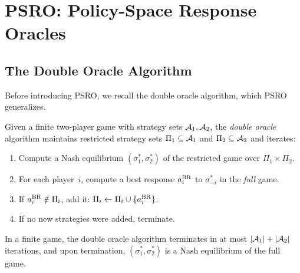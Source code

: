 \documentclass[11pt,a4paper]{article}
\begin{document}
\section{PSRO: Policy-Space Response Oracles}
\label{sec:psro}

\subsection{The Double Oracle Algorithm}

Before introducing PSRO, we recall the double oracle algorithm, which
PSRO generalizes.

\begin{definition}
\label{def:double-oracle}
Given a finite two-player game with strategy sets $\mathcal{A}_1, \mathcal{A}_2$,
the \emph{double oracle} algorithm maintains restricted strategy sets
$\Pi_1 \subseteq \mathcal{A}_1$ and $\Pi_2 \subseteq \mathcal{A}_2$ and
iterates:
\begin{enumerate}
  \item Compute a Nash equilibrium $(\sigma_1^*, \sigma_2^*)$ of the
    restricted game over $\Pi_1 \times \Pi_2$.
  \item For each player~$i$, compute a best response $a_i^{\mathrm{BR}}$ to
    $\sigma_{-i}^*$ in the \emph{full} game.
  \item If $a_i^{\mathrm{BR}} \notin \Pi_i$, add it: $\Pi_i \leftarrow \Pi_i
    \cup \{a_i^{\mathrm{BR}}\}$.
  \item If no new strategies were added, terminate.
\end{enumerate}
\end{definition}

\begin{lemma}
\label{lem:double-oracle-termination}
In a finite game, the double oracle algorithm terminates in at most
$|\mathcal{A}_1| + |\mathcal{A}_2|$ iterations, and upon termination,
$(\sigma_1^*, \sigma_2^*)$ is a Nash equilibrium of the full game.
\end{lemma}
\end{document}
